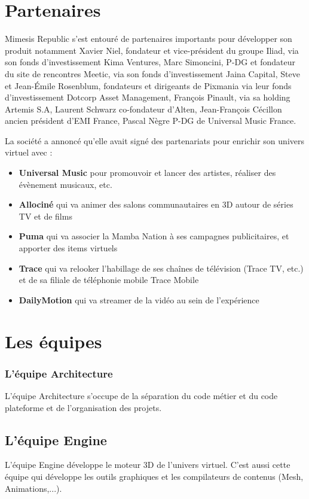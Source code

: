 \section{Partenaires}

Mimesis Republic s'est entouré de partenaires importants pour développer son
produit notamment Xavier Niel, fondateur et vice-président du groupe Iliad, via
son fonds d’investissement Kima Ventures, Marc Simoncini, P-DG et fondateur du
site de rencontres Meetic, via son fonds d'investissement Jaina Capital, Steve
et Jean-Émile Rosenblum, fondateurs et dirigeants de Pixmania via leur fonds
d'investissement Dotcorp Asset Management, François Pinault, via sa holding
Artemis S.A, Laurent Schwarz co-fondateur d'Alten, Jean-François Cécillon ancien
président d'EMI France, Pascal Nègre P-DG de Universal Music France.

La société a annoncé qu'elle avait signé des partenariats pour enrichir son
univers virtuel avec :
\begin{itemize}
\item[\textbullet]\textbf{Universal Music} pour promouvoir et lancer des artistes,
  réaliser des évènement musicaux, etc.
\item[\textbullet]\textbf{Allociné} qui va animer des salons communautaires en
  3D autour de séries TV et de films
\item[\textbullet]\textbf{Puma} qui va associer la Mamba Nation à ses
  campagnes publicitaires, et apporter des items virtuels
\item[\textbullet]\textbf{Trace} qui va relooker l'habillage de ses chaînes de
  télévision (Trace TV, etc.) et de sa filiale de téléphonie mobile Trace
  Mobile
\item[\textbullet]\textbf{DailyMotion} qui va streamer de la vidéo au sein de
  l’expérience
\end{itemize}


\section{Les équipes}

\subsubsection{L'équipe Architecture}
L'équipe Architecture s'occupe de la séparation du code métier et du code
plateforme et de l'organisation des projets.

\subsection{L'équipe Engine}
L'équipe Engine développe le moteur 3D de l'univers virtuel.
C'est aussi cette équipe qui développe les outils graphiques et les compilateurs
de contenus (Mesh, Animations,...).

